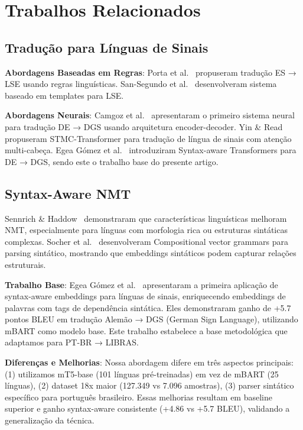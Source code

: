 \documentclass[12pt]{article}
\begin{document}
\section{Trabalhos Relacionados}

\subsection{Tradução para Línguas de Sinais}

\textbf{Abordagens Baseadas em Regras}:
Porta et al.~\cite{porta2014} propuseram tradução ES → LSE usando regras linguísticas. San-Segundo et al.~\cite{sansegundo2010} desenvolveram sistema baseado em templates para LSE.

\textbf{Abordagens Neurais}:
Camgoz et al.~\cite{camgoz2018} apresentaram o primeiro sistema neural para tradução DE → DGS usando arquitetura encoder-decoder. Yin \& Read~\cite{yin2020} propuseram STMC-Transformer para tradução de língua de sinais com atenção multi-cabeça. Egea Gómez et al.~\cite{egea2021} introduziram Syntax-aware Transformers para DE → DGS, sendo este o trabalho base do presente artigo.

\subsection{Syntax-Aware NMT}

Sennrich \& Haddow~\cite{sennrich2016} demonstraram que características linguísticas melhoram NMT, especialmente para línguas com morfologia rica ou estruturas sintáticas complexas. Socher et al.~\cite{socher2013} desenvolveram Compositional vector grammars para parsing sintático, mostrando que embeddings sintáticos podem capturar relações estruturais.

\textbf{Trabalho Base}: Egea Gómez et al.~\cite{egea2021} apresentaram a primeira aplicação de syntax-aware embeddings para línguas de sinais, enriquecendo embeddings de palavras com tags de dependência sintática. Eles demonstraram ganho de +5.7 pontos BLEU em tradução Alemão → DGS (German Sign Language), utilizando mBART como modelo base. Este trabalho estabelece a base metodológica que adaptamos para PT-BR → LIBRAS.

\textbf{Diferenças e Melhorias}: Nossa abordagem difere em três aspectos principais: (1) utilizamos mT5-base (101 línguas pré-treinadas) em vez de mBART (25 línguas), (2) dataset 18x maior (127.349 vs 7.096 amostras), (3) parser sintático específico para português brasileiro. Essas melhorias resultam em baseline superior e ganho syntax-aware consistente (+4.86 vs +5.7 BLEU), validando a generalização da técnica.
\end{document}
